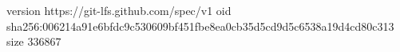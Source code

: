 version https://git-lfs.github.com/spec/v1
oid sha256:006214a91e6bfdc9c530609bf451fbe8ea0cb35d5cd9d5c6538a19d4cd80c313
size 336867
